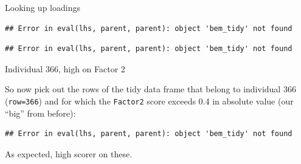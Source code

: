 \documentclass[ignorenonframetext,]{beamer}
\newenvironment{Shaded}{\begin{snugshade}}{\end{snugshade}}
\newcommand{\DecValTok}[1]{\textcolor[rgb]{0.00,0.00,0.81}{#1}}
\newcommand{\FloatTok}[1]{\textcolor[rgb]{0.00,0.00,0.81}{#1}}
\newcommand{\KeywordTok}[1]{\textcolor[rgb]{0.13,0.29,0.53}{\textbf{#1}}}
\newcommand{\NormalTok}[1]{#1}
\newcommand{\OperatorTok}[1]{\textcolor[rgb]{0.81,0.36,0.00}{\textbf{#1}}}
\newcommand{\StringTok}[1]{\textcolor[rgb]{0.31,0.60,0.02}{#1}}
\begin{document}
\begin{frame}[fragile]{Looking up loadings}
\protect\hypertarget{looking-up-loadings}{}

\begin{Shaded}
\end{Shaded}

\begin{verbatim}
## Error in eval(lhs, parent, parent): object 'bem_tidy' not found
\end{verbatim}

\begin{Shaded}
\end{Shaded}

\begin{verbatim}
## Error in eval(lhs, parent, parent): object 'bem_tidy' not found
\end{verbatim}

\end{frame}

\begin{frame}[fragile]{Individual 366, high on Factor 2}
\protect\hypertarget{individual-366-high-on-factor-2}{}

So now pick out the rows of the tidy data frame that belong to
individual 366 (\texttt{row=366}) and for which the \texttt{Factor2}
score exceeds 0.4 in absolute value (our ``big'' from before):

\begin{Shaded}
\end{Shaded}

\begin{verbatim}
## Error in eval(lhs, parent, parent): object 'bem_tidy' not found
\end{verbatim}

As expected, high scorer on these.

\end{frame}
\end{document}
